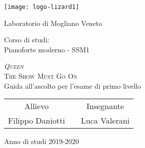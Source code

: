 \begin{titlepage}
 \centering
 \texttt{[image: logo-lizard1]}

 \vspace{1.2cm}
 \LARGE{Laboratorio di Mogliano Veneto\\}

 \vspace{1cm}
 \Large{Corso di studi:\\ Pianoforte moderno - SSM1}

 \vspace{1cm}
 \Huge\textsc{\textit{Queen}\\ The Show Must Go On\\}
 \vspace{.5cm}
 \large{Guida all'ascolto per l'esame di primo livello\\}

 \vspace{1.5cm}
 \begin{tabularx}{\textwidth}{cXc}
  \Large{Allievo}          &  & \Large{Insegnante}    \\
  \cmidrule(lr){1-1} \cmidrule(lr){3-3}
  \large{Filippo Daniotti} &  & \large{Luca Valerani} \\
 \end{tabularx}

 \vspace{1.5cm}
 \LARGE{Anno di studi 2019-2020}
\end{titlepage}
